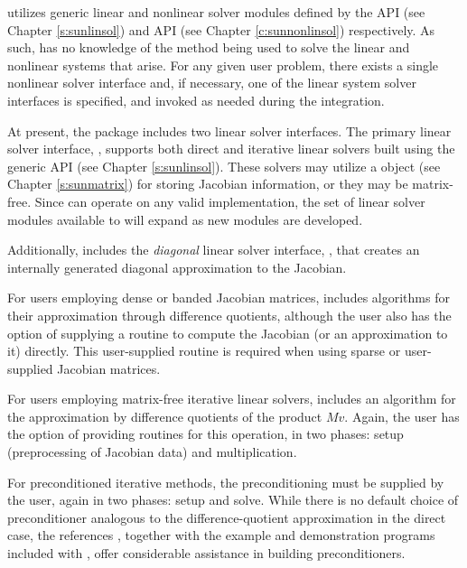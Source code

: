 {\cvode} utilizes generic linear and nonlinear solver modules defined by the
{\sunlinsol} API (see Chapter \ref{s:sunlinsol}) and {\sunnonlinsol} API (see
Chapter \ref{c:sunnonlinsol}) respectively. As such, {\cvode} has no knowledge
of the method being used to solve the linear and nonlinear systems that
arise. For any given user problem, there exists a single nonlinear solver
interface and, if necessary, one of the linear system solver interfaces is
specified, and invoked as needed during the integration.

At present, the package includes two linear solver interfaces.  The
primary linear solver interface, {\cvls}, supports both direct and
iterative linear solvers built using the generic {\sunlinsol} API (see
Chapter \ref{s:sunlinsol}).  These solvers may utilize a {\sunmatrix}
object (see Chapter \ref{s:sunmatrix}) for storing Jacobian
information, or they may be matrix-free. Since {\cvode} can operate on
any valid {\sunlinsol} implementation, the set of linear solver
modules available to {\cvode} will expand as new {\sunlinsol} modules
are developed.

Additionally, {\cvode} includes the {\em diagonal} linear solver
interface, {\cvdiag}, that creates an internally generated diagonal
approximation to the Jacobian.

For users employing dense or banded Jacobian matrices, {\cvode}
includes algorithms for their approximation through difference 
quotients, although the user also has the option of supplying a
routine to compute the Jacobian (or an approximation to it) directly.
This user-supplied routine is required when using sparse or
user-supplied Jacobian matrices.

For users employing matrix-free iterative linear solvers,
 {\cvode}
includes an algorithm for the approximation by difference quotients of
the product $Mv$. Again, the user has the option of providing routines
for this operation, in two phases: setup (preprocessing of Jacobian
data) and multiplication. 

For preconditioned iterative methods,  
the preconditioning must be supplied by the user, again in two phases: 
setup and solve.  While there is no
default choice of preconditioner analogous to the difference-quotient
approximation in the direct case, the references
\cite{BrHi:89,Byr:92}, together with the example and demonstration
programs included with {\cvode}, offer considerable assistance in
building preconditioners. 

